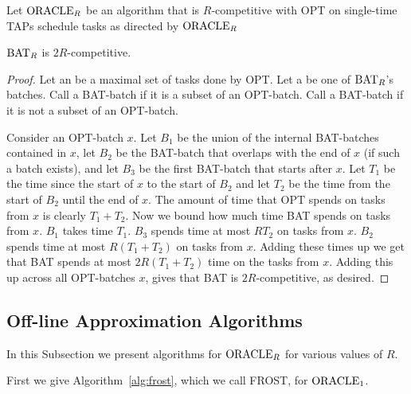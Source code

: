 \begin{algorithm}
  \caption{$\bat_R$}
  \label{alg:bat}
  \begin{algorithmic}
    \State Let $\operatorname{\text{ORACLE}}_R$ be an algorithm that is $R$-competitive with OPT on single-time TAPs 
      \State schedule tasks as directed by $\operatorname{\text{ORACLE}}_R$
    \EndIf
  \end{algorithmic}
\end{algorithm}

\begin{theorem}
  \label{thm:constant_competitive}
  $\bat_R$ is $2R$-competitive.
\end{theorem}
\begin{proof}
  Let an  be a maximal set of tasks done by OPT.
  Let a  be one of $\bat_R$'s batches. Call a BAT-batch
   if it is a subset of an OPT-batch. Call a
  BAT-batch  if it is not a subset of an
  OPT-batch. 

  Consider an OPT-batch $x$. Let $B_1$ be the union of the
  internal BAT-batches contained in $x$, let $B_2$ be the
  BAT-batch that overlaps with the end of $x$ (if such a batch
  exists), and let $B_3$ be the first BAT-batch that starts after
  $x$. Let $T_1$ be the time since the start of $x$ to the start
  of $B_2$ and let $T_2$ be the time from the start of $B_2$
  until the end of $x$. The amount of time that OPT spends on
  tasks from $x$ is clearly $T_1+T_2$. Now we bound how much time
  BAT spends on tasks from $x$. $B_1$ takes time $T_1$. $B_3$
  spends time at most $RT_2$ on tasks from $x$. $B_2$ spends time
  at most $R(T_1 + T_2)$ on tasks from $x$. Adding these times up
  we get that BAT spends at most $2R(T_1+T_2)$ time on the tasks
  from $x$. Adding this up across all OPT-batches $x$, gives that
  BAT is $2R$-competitive, as desired.
\end{proof}

\subsection{Off-line Approximation Algorithms}
\label{subsec:offlineawaketime}
In this Subsection we present algorithms for $\operatorname{\text{ORACLE}}_R$ for
various values of $R$.

First we give Algorithm~\ref{alg:frost}, which we call
FROST, for $\operatorname{\text{ORACLE}}_1$. 

